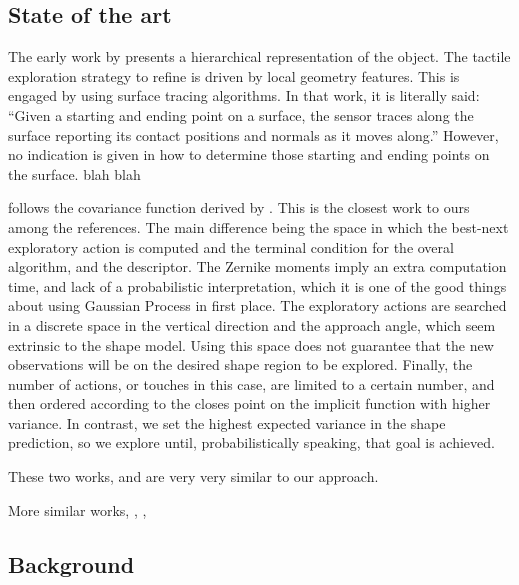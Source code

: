 \subsection{State of the art}
\label{sec:SoA}

The early work by \citet{Allen1987Robotic} presents a hierarchical representation of the object. The tactile exploration strategy to refine is driven by local geometry features. This is engaged by using surface tracing algorithms. In that work, it is literally said: ``Given a starting and ending point on a surface, the sensor traces along the surface reporting its contact positions and normals as it moves along.'' However, no indication is given in how to determine those starting and ending points on the surface. \citet{Allen1990Acquisition} blah blah

\citet{Bjorkman2013Enhancing} follows the covariance function derived by \citet{Williams2007Gaussian}. This is the closest work to ours among the references. The main difference being the space in which the best-next exploratory action is computed and the terminal condition for the overal algorithm, and the descriptor. The Zernike moments imply an extra computation time, and lack of a probabilistic interpretation, which it is one of the good things about using Gaussian Process in first place. The exploratory actions are searched in a discrete space in the vertical direction and the approach angle, which seem extrinsic to the shape model. Using this space does not guarantee that the new observations will be on the desired shape region to be explored.  Finally, the number of actions, or touches in this case, are limited to a certain number, and then ordered according to the closes point on the implicit function with higher variance. In contrast, we set the highest expected variance in the shape prediction, so we explore until, probabilistically speaking, that goal is achieved.

These two works, \citet{Bjorkman2013Enhancing} and \cite{Dragiev2013Uncertainty} are very very similar to our approach.

More similar works, \citet{Bierbaum2008Potential}, \citet{Meier2011Probabilistic}, \citet{Sommer2014Bimanual}

\subsection{Background}
\label{sec:background}


